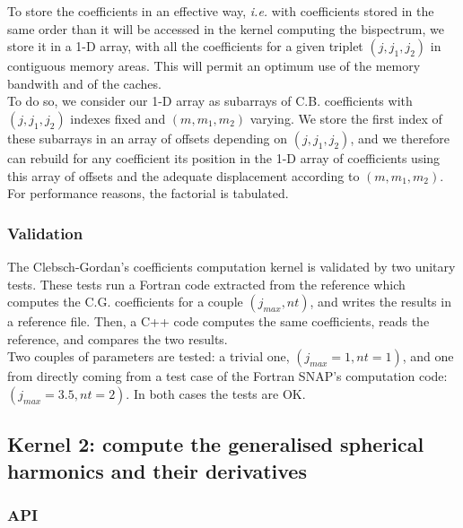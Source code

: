 \documentclass[12pt]{article}
\begin{document}
	To store the coefficients in an effective way, \textit{i.e.} with coefficients stored in the same order than it will be accessed in the kernel computing the bispectrum, we store it in a 1-D array, with all the coefficients for a given triplet $\left(j,j_1,j_2\right)$ in contiguous memory areas. This will permit an optimum use of the memory bandwith and of the caches. \\
To do so, we consider our 1-D array as subarrays of C.B. coefficients with $\left(j,j_1,j_2\right)$ indexes fixed and $\left(m,m_1,m_2\right)$ varying. We store the first index of these subarrays in an array of offsets depending on $\left(j,j_1,j_2\right)$, and we therefore can rebuild for any coefficient its position in the 1-D array of coefficients using this array of offsets and the adequate displacement according to $\left(m,m_1,m_2\right)$.\\

        For performance reasons, the factorial is tabulated. \\

    \subsubsection{Validation}

    The Clebsch-Gordan's coefficients computation kernel is validated by two unitary tests. These tests run a Fortran code extracted from the reference which computes the C.G. coefficients for a couple $\left(j_{max},nt\right)$, and writes the results in a reference file. Then, a C++ code computes the same coefficients, reads the reference, and compares the two results. \\
Two couples of parameters are tested: a trivial one, $\left(j_{max}=1,nt=1\right)$, and one from directly coming from a test case of the Fortran SNAP's computation code: $\left(j_{max}=3.5,nt=2\right)$. In both cases the tests are OK.

	

    \subsection{Kernel 2: compute the generalised spherical harmonics and their derivatives}


      \subsubsection{API}
\end{document}
